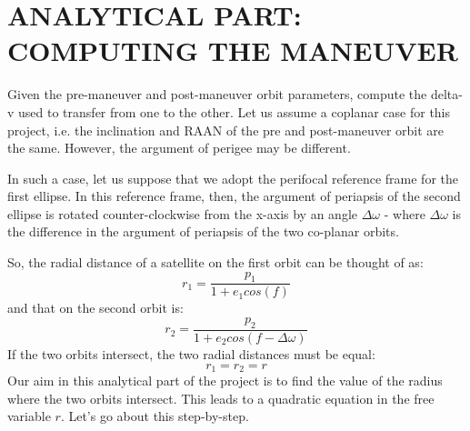 \documentclass[12pt, letterpaper]{aiaa-tc}
\begin{document}
\section{ANALYTICAL PART: COMPUTING THE MANEUVER}

Given the pre-maneuver and post-maneuver orbit parameters, compute the delta-v used to transfer from one to the
other. Let us assume a coplanar case for this project, i.e. the inclination and RAAN of the pre and post-maneuver
orbit are the same. However, the argument of perigee may be different.

In such a case, let us suppose that we adopt the perifocal reference frame for the first ellipse. In this reference
frame, then, the argument of periapsis of the second ellipse is rotated counter-clockwise from the x-axis by an
angle $\Delta\omega$ - where $\Delta\omega$ is the difference in the argument of periapsis of the two co-planar orbits.

So, the radial distance of a satellite on the first orbit can be thought of as:
\begin{equation}
    r_1=\frac{p_1}{1+e_1 cos(f)}
    \label{eq:orbitequation1}
\end{equation}
and that on the second orbit is:
\begin{equation}
    r_2=\frac{p_2}{1+e_2 cos(f-\Delta\omega)}
    \label{eq:orbitequation2}
\end{equation}
If the two orbits intersect, the two radial distances must be equal:
\[ r_1=r_2=r \]
Our aim in this analytical part of the project is to find the value of the radius where the two orbits intersect. This
leads to a quadratic equation in the free variable $r$. Let’s go about this step-by-step.
\end{document}
